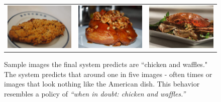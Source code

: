 \documentclass[letterpaper, 10 pt, conference]{ieeeconf}
\begin{document}
\begin{figure}
\begin{center}
\begin{tabular}{lll}
 \includegraphics[scale = .23]{c7}& \includegraphics[scale = .23]{c8} & \includegraphics[scale = .23]{c9}
\end{tabular}
\end{center}
\caption{Sample images the final system predicts are ``chicken and waffles." The system predicts that around one in five images - often times or images that look nothing like the American dish. This behavior resembles a policy of \textit{``when in doubt: chicken and waffles.''}}
\end{figure}
\end{document}
